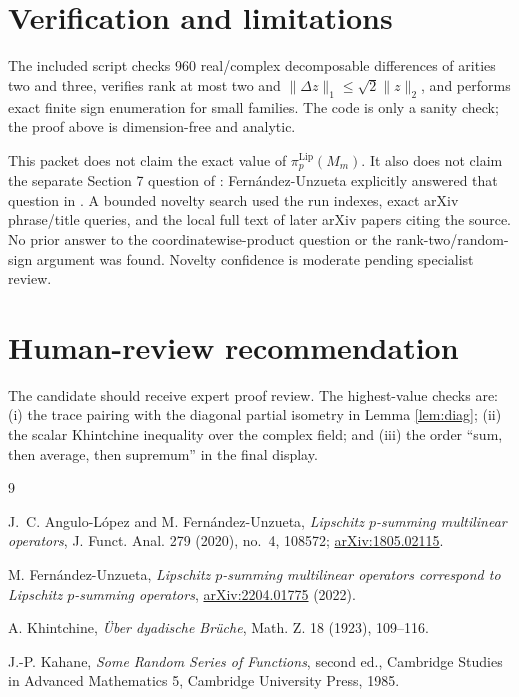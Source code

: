 \documentclass[11pt]{article}
\newcommand{\Lip}{\mathrm{Lip}}
\begin{document}
\section{Verification and limitations}

The included script checks 960 real/complex decomposable differences of
arities two and three, verifies rank at most two and
$\|\Delta z\|_1\le\sqrt2\|z\|_2$, and performs exact finite sign enumeration
for small families.  The code is only a sanity check; the proof above is
dimension-free and analytic.

This packet does not claim the exact value of $\pi_p^{\Lip}(M_m)$.  It also
does not claim the separate Section 7 question of \cite{AnguloFernandez2020}:
Fern\'andez-Unzueta explicitly answered that question in
\cite{Fernandez2022}.  A bounded novelty search used the run indexes, exact
arXiv phrase/title queries, and the local full text of later arXiv papers
citing the source.  No prior answer to the coordinatewise-product question or
the rank-two/random-sign argument was found.  Novelty confidence is moderate
pending specialist review.

\section{Human-review recommendation}

The candidate should receive expert proof review.  The highest-value checks
are: (i) the trace pairing with the diagonal partial isometry in Lemma
\ref{lem:diag}; (ii) the scalar Khintchine inequality over the complex field;
and (iii) the order ``sum, then average, then supremum'' in the final display.

\begin{thebibliography}{9}

J.~C. Angulo-L\'opez and M. Fern\'andez-Unzueta,
\emph{Lipschitz $p$-summing multilinear operators},
J. Funct. Anal. 279 (2020), no.~4, 108572;
\href{https://arxiv.org/abs/1805.02115}{arXiv:1805.02115}.

M. Fern\'andez-Unzueta,
\emph{Lipschitz $p$-summing multilinear operators correspond to Lipschitz
$p$-summing operators},
\href{https://arxiv.org/abs/2204.01775}{arXiv:2204.01775} (2022).

A. Khintchine,
\emph{\"Uber dyadische Br\"uche},
Math. Z. 18 (1923), 109--116.

J.-P. Kahane,
\emph{Some Random Series of Functions}, second ed.,
Cambridge Studies in Advanced Mathematics 5, Cambridge University Press, 1985.

\end{thebibliography}
\end{document}
